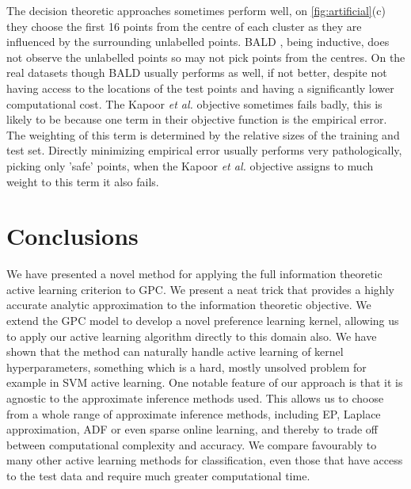 \documentclass{article}
\newcommand{\ourmethod}{BALD } %
\begin{document}
The decision theoretic approaches sometimes perform well, on \ref{fig:artificial}(c) they choose the first 16 points from the centre of each cluster as they are influenced by the surrounding unlabelled points. \ourmethod, being inductive, does not observe the unlabelled points so may not pick points from the centres. On the real datasets though BALD usually performs as well, if not better, despite not having access to the locations of the test points and having a significantly lower computational cost. The Kapoor \emph{et al.} objective sometimes fails badly, this is likely to be because one term in their objective function is the empirical error. The weighting of this term is determined by the relative sizes of the training and test set. Directly minimizing empirical error usually performs very pathologically, picking only 'safe' points, when the Kapoor \emph{et al.} objective assigns to much weight to this term it also fails.

\section{Conclusions}

We have presented a novel method for applying the full information theoretic active learning criterion to GPC. We present a neat trick that provides a highly accurate analytic approximation to the information theoretic objective. We extend the GPC model to develop a novel preference learning kernel, allowing us to apply our active learning algorithm directly to this domain also. We have shown that the method can naturally handle active learning of kernel hyperparameters, something which is a hard, mostly unsolved problem for example in SVM active learning. One notable feature of our approach is that it is agnostic to the approximate inference methods used. This allows us to choose from a whole range of approximate inference methods, including EP, Laplace approximation, ADF or even sparse online learning, and thereby to trade off between computational complexity and accuracy. We compare favourably to many other active learning methods for classification, even those that have access to the test data and require much greater computational time.



{\small


}
\end{document}
